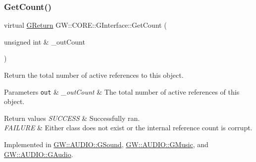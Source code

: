 \mbox{\label{classGW_1_1CORE_1_1GInterface_aacf5834174a7024f8a3c361122ee9e76}} 
\subsubsection{\texorpdfstring{Get\+Count()}{GetCount()}}
{\footnotesize\ttfamily virtual \hyperlink{namespaceGW_a67a839e3df7ea8a5c5686613a7a3de21}{G\+Return} G\+W\+::\+C\+O\+R\+E\+::\+G\+Interface\+::\+Get\+Count (\begin{DoxyParamCaption}\item[{unsigned int \&}]{\+\_\+out\+Count }\end{DoxyParamCaption})\hspace{0.3cm}{\ttfamily [pure virtual]}}



Return the total number of active references to this object. 


\begin{DoxyParams}[1]{Parameters}
\mbox{\tt out}  & {\em \+\_\+out\+Count} & The total number of active references of this object.\\
\hline
\end{DoxyParams}

\begin{DoxyRetVals}{Return values}
{\em S\+U\+C\+C\+E\+SS} & Successfully ran. \\
\hline
{\em F\+A\+I\+L\+U\+RE} & Either class does not exist or the internal reference count is corrupt. \\
\hline
\end{DoxyRetVals}


Implemented in \hyperlink{classGW_1_1AUDIO_1_1GSound_afbac022010da2fc1a917ece2803a36a4}{G\+W\+::\+A\+U\+D\+I\+O\+::\+G\+Sound}, \hyperlink{classGW_1_1AUDIO_1_1GMusic_ae41f54531b8325848215596fb2f821ac}{G\+W\+::\+A\+U\+D\+I\+O\+::\+G\+Music}, and \hyperlink{classGW_1_1AUDIO_1_1GAudio_a079dfab7b9db1536b10c9d2afa20c89c}{G\+W\+::\+A\+U\+D\+I\+O\+::\+G\+Audio}.

\mbox{\label{classGW_1_1CORE_1_1GInterface_a2d710f20bb78e544e8309b5b75c21260}} 
